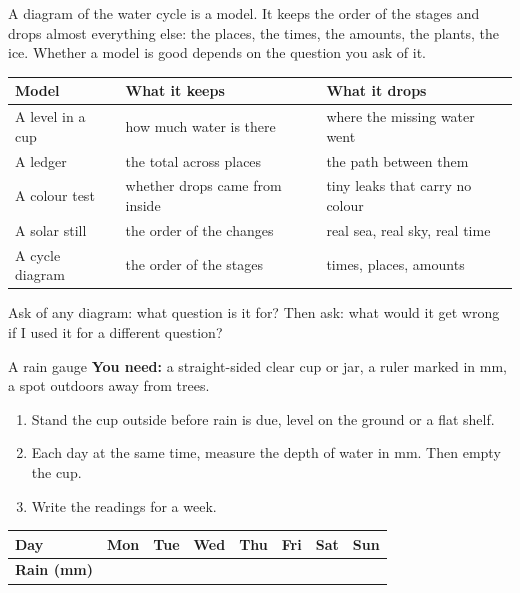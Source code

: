 \label{ch6}

A diagram of the water cycle is a model. It keeps the order of the stages and drops almost everything else: the places, the times, the amounts, the plants, the ice. Whether a model is good depends on the question you ask of it.

\begin{center}
\sffamily\small\renewcommand{\arraystretch}{1.5}
\begin{tabular}{@{}p{3.4cm}p{3.7cm}p{3.7cm}@{}}
\toprule
\textbf{Model} & \textbf{What it keeps} & \textbf{What it drops}\\
\midrule
A level in a cup & how much water is there & where the missing water went\\
A ledger & the total across places & the path between them\\
A colour test & whether drops came from inside & tiny leaks that carry no colour\\
A solar still & the order of the changes & real sea, real sky, real time\\
A cycle diagram & the order of the stages & times, places, amounts\\
\bottomrule
\end{tabular}
\end{center}

Ask of any diagram: what question is it for? Then ask: what would it get wrong if I used it for a different question?

\begin{tryit}{A rain gauge}
\textbf{You need:} a straight-sided clear cup or jar, a ruler marked in mm, a spot outdoors away from trees.
\begin{enumerate}[leftmargin=1.6em]
\item Stand the cup outside before rain is due, level on the ground or a flat shelf.
\item Each day at the same time, measure the depth of water in mm. Then empty the cup.
\item Write the readings for a week.
\end{enumerate}
\par\medskip
\renewcommand{\arraystretch}{1.6}
\begin{tabular}{|l|c|c|c|c|c|c|c|}
\hline
\textbf{Day} & Mon & Tue & Wed & Thu & Fri & Sat & Sun\\ \hline
\textbf{Rain (mm)} & & & & & & & \\ \hline
\end{tabular}
\end{tryit}

